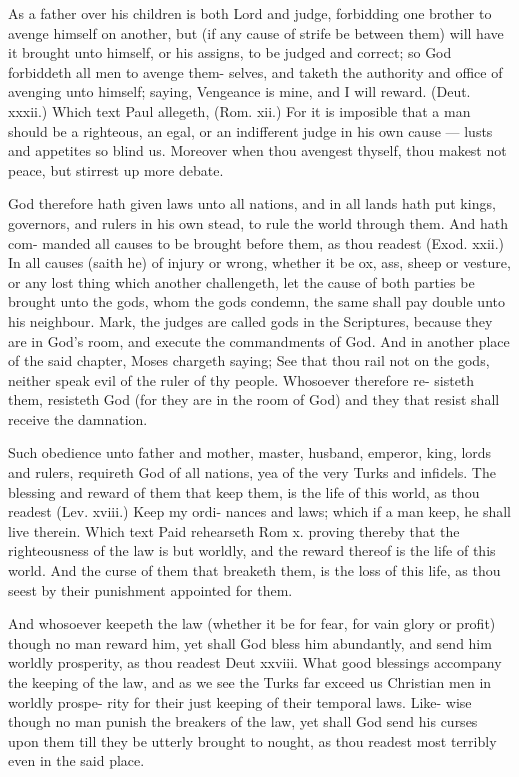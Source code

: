 \documentclass{custom}
\begin{document}
As a father over his children is both Lord and judge, 
forbidding one brother to avenge himself on another, but
(if any cause of strife be between them) will have it 
brought unto himself, or his assigns, to be judged and 
correct; so God forbiddeth all men to avenge them- 
selves, and taketh the authority and office of avenging unto 
himself; saying, Vengeance is mine, and I will reward. 
(Deut. xxxii.) Which text Paul allegeth, (Rom. xii.) 
For it is imposible that a man should be a righteous, an 
egal, or an indifferent judge in his own cause — lusts and 
appetites so blind us. Moreover when thou avengest 
thyself, thou makest not peace, but stirrest up more 
debate. 

God therefore hath given laws unto all nations, and in 
all lands hath put kings, governors, and rulers in his own 
stead, to rule the world through them. And hath com- 
manded all causes to be brought before them, as thou readest 
(Exod. xxii.) In all causes (saith he) of injury or wrong, 
whether it be ox, ass, sheep or vesture, or any lost thing 
which another challengeth, let the cause of both parties be 
brought unto the gods, whom the gods condemn, the 
same shall pay double unto his neighbour. Mark, the 
judges are called gods in the Scriptures, because they are 
in God's room, and execute the commandments of God. 
And in another place of the said chapter, Moses chargeth 
saying; See that thou rail not on the gods, neither speak 
evil of the ruler of thy people. Whosoever therefore re- 
sisteth them, resisteth God (for they are in the room of 
God) and they that resist shall receive the damnation. 

Such obedience unto father and mother, master, 
husband, emperor, king, lords and rulers, requireth God 
of all nations, yea of the very Turks and infidels. The 
blessing and reward of them that keep them, is the life of 
this world, as thou readest (Lev. xviii.) Keep my ordi- 
nances and laws; which if a man keep, he shall live 
therein. Which text Paid rehearseth Rom x. proving 
thereby that the righteousness of the law is but worldly, 
and the reward thereof is the life of this world. And the 
curse of them that breaketh them, is the loss of this life, 
as thou seest by their punishment appointed for them.

And whosoever keepeth the law (whether it be for fear, 
for vain glory or profit) though no man reward him, yet 
shall God bless him abundantly, and send him worldly 
prosperity, as thou readest Deut xxviii. What good 
blessings accompany the keeping of the law, and as we 
see the Turks far exceed us Christian men in worldly prospe-
rity for their just keeping of their temporal laws. Like- 
wise though no man punish the breakers of the law, yet 
shall God send his curses upon them till they be utterly 
brought to nought, as thou readest most terribly even in 
the said place.
\end{document}
